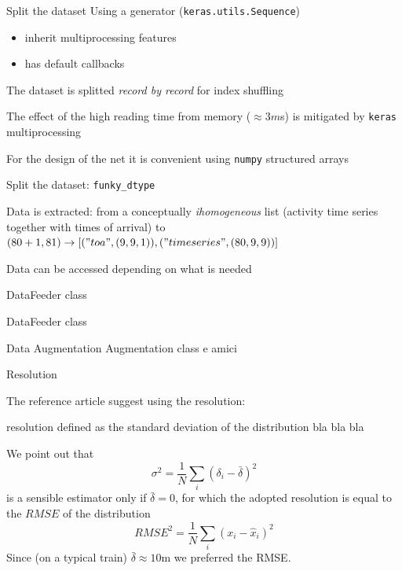 \documentclass{beamer}
\begin{document}
\begin{frame}{Split the dataset}
    Using a generator (\texttt{keras.utils.Sequence})
    \begin{itemize}
        \item inherit multiprocessing features
        \item has default callbacks
    \end{itemize}
    The dataset is splitted \emph{record by record} for index shuffling

    The effect of the high reading time from memory ($\approx 3 m$s) is mitigated
    by \texttt{keras} multiprocessing
    
    For the design of the net it is convenient using \texttt{numpy} structured arrays
\end{frame}

\begin{frame}{Split the dataset: \texttt{funky\_dtype}}

    Data is extracted: from a conceptually \emph{ihomogeneous} list 
    (activity time series together with times of arrival) to
    $(80 + 1, 81) \rightarrow [("toa", (9, 9, 1)), ("timeseries", (80, 9,9))]$

    Data can be accessed depending on what is needed

\end{frame}


\begin{frame}{DataFeeder class}

    
\end{frame}

\begin{frame}{DataFeeder class}

    
\end{frame}

\begin{frame}{Data Augmentation}
    Augmentation class e amici
    
\end{frame}

\begin{frame}{Resolution}

    The reference article suggest using the resolution:
    \begin{block}{resolution}
        defined as the standard deviation of the distribution bla bla bla
    \end{block}

    We point out that 
    \[\sigma^2 = \frac{1}{N}\sum_i (\delta_i - \bar{\delta})^2\]
    is a sensible
    estimator only if $\bar{\delta} = 0$, for which the adopted resolution is equal 
    to the $RMSE$ of the distribution
    \[ RMSE^2 = \frac{1}{N}\sum_i(x_i - \hat{x}_i)^2 \]
    Since (on a typical train) $\bar{\delta} \approx 10$m we preferred the RMSE.
\end{frame}
\end{document}
